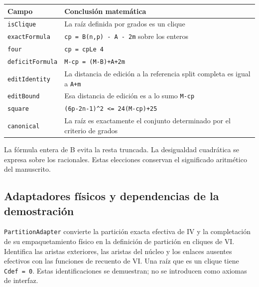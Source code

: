 \documentclass[spanish,11pt,a4paper]{article}
\newcounter{none}
\begin{document}
{\def\LTcaptype{none} %
\begin{longtable}[]{@{}
  >{\raggedright\arraybackslash}p{}
  >{\raggedright\arraybackslash}p{}@{}}
\toprule\noalign{}
\begin{minipage}[b]{\linewidth}\raggedright
Campo
\end{minipage} & \begin{minipage}[b]{\linewidth}\raggedright
Conclusión matemática
\end{minipage} \\
\midrule\noalign{}
\endhead
\bottomrule\noalign{}
\endlastfoot
\nolinkurl{isClique} & La raíz definida por grados es un clique \\
\nolinkurl{exactFormula} & \texttt{cp\ =\ B(n,p)\ -\ A\ -\ 2m} sobre los
enteros \\
\nolinkurl{four} & \texttt{cp\ =\ cpLe\ 4} \\
\nolinkurl{deficitFormula} & \texttt{M-cp\ =\ (M-B)+A+2m} \\
\nolinkurl{editIdentity} & La distancia de edición a la referencia split
completa es igual a \nolinkurl{A+m} \\
\nolinkurl{editBound} & Esa distancia de edición es a lo sumo
\nolinkurl{M-cp} \\
\nolinkurl{square} & \texttt{(6p-2n-1)\^{}2\ \textless{}=\ 24(M-cp)+25} \\
\nolinkurl{canonical} & La raíz es exactamente el conjunto determinado por
el criterio de grados \\
\end{longtable}
}

La fórmula entera de B evita la resta truncada. La desigualdad
cuadrática se expresa sobre los racionales. Estas elecciones conservan
el significado aritmético del manuscrito.

\subsection{Adaptadores físicos y dependencias de la
demostración}\label{adaptadores-fuxedsicos-y-dependencias-de-la-demostraciuxf3n}

\nolinkurl{PartitionAdapter} convierte la partición exacta efectiva de IV y
la completación de su empaquetamiento físico en la definición de
partición en cliques de VI. Identifica las aristas exteriores, las
aristas del núcleo y los enlaces ausentes efectivos con las funciones de
recuento de VI. Una raíz que es un clique tiene \texttt{Cdef\ =\ 0}.
Estas identificaciones se demuestran; no se introducen como axiomas de
interfaz.
\end{document}
